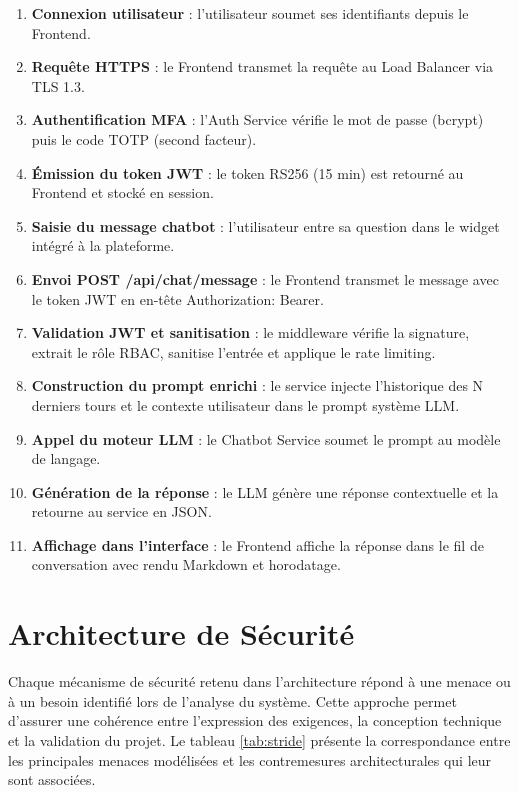 \begin{enumerate}
    \item \textbf{Connexion utilisateur} : l'utilisateur soumet ses identifiants depuis le Frontend.
    \item \textbf{Requête HTTPS} : le Frontend transmet la requête au Load Balancer via TLS 1.3.
    \item \textbf{Authentification MFA} : l'Auth Service vérifie le mot de passe (bcrypt) puis le code TOTP (second facteur).
    \item \textbf{Émission du token JWT} : le token RS256 (15 min) est retourné au Frontend et stocké en session.
    \item \textbf{Saisie du message chatbot} : l'utilisateur entre sa question dans le widget intégré à la plateforme.
    \item \textbf{Envoi POST /api/chat/message} : le Frontend transmet le message avec le token JWT en en-tête Authorization: Bearer.
    \item \textbf{Validation JWT et sanitisation} : le middleware vérifie la signature, extrait le rôle RBAC, sanitise l'entrée et applique le rate limiting.
    \item \textbf{Construction du prompt enrichi} : le service injecte l'historique des N derniers tours et le contexte utilisateur dans le prompt système LLM.
    \item \textbf{Appel du moteur LLM} : le Chatbot Service soumet le prompt au modèle de langage.
    \item \textbf{Génération de la réponse} : le LLM génère une réponse contextuelle et la retourne au service en JSON.
    \item \textbf{Affichage dans l'interface} : le Frontend affiche la réponse dans le fil de conversation avec rendu Markdown et horodatage.
\end{enumerate}

\section{Architecture de Sécurité}
Chaque mécanisme de sécurité retenu dans l'architecture répond à une menace ou à un besoin identifié lors de l'analyse du système. Cette approche permet d'assurer une cohérence entre l'expression des exigences, la conception technique et la validation du projet. Le tableau \ref{tab:stride} présente la correspondance entre les principales menaces modélisées et les contremesures architecturales qui leur sont associées.

